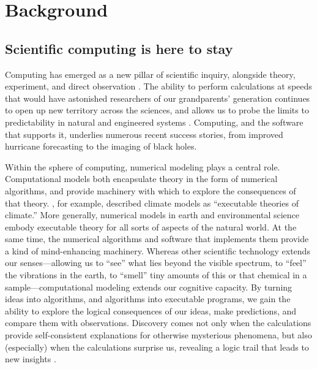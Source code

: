 \documentclass[12pt]{amsart}
\begin{document}
\section{Background}
\label{sec:background}

\subsection{Scientific computing is here to stay}

Computing has emerged as a new pillar of scientific inquiry, alongside theory, experiment, and direct observation  \citep{pitac2005computational}. The ability to perform calculations at speeds that would have astonished researchers of our grandparents' generation continues to open up new territory across the sciences, and allows us to probe the limits to predictability in natural and engineered systems \citep{post2005computational,post2013changing}. Computing, and the software that supports it, underlies numerous recent success stories, from improved hurricane forecasting to the imaging of black holes. 

Within the sphere of computing, numerical modeling plays a central role. Computational models both encapsulate theory in the form of numerical algorithms, and provide machinery with which to explore the consequences of that theory. \citet{pipitone2012assessing}, for example, described climate models as ``executable theories of climate.'' More generally, numerical models in earth and environmental science embody executable theory for all sorts of aspects of the natural world. At the same time, the numerical algorithms and software that implements them provide a kind of mind-enhancing machinery. Whereas other scientific technology extends our senses---allowing us to ``see'' what lies beyond the visible spectrum, to ``feel'' the vibrations in the earth, to ``smell'' tiny amounts of this or that chemical in a sample---computational modeling extends our cognitive capacity. By turning ideas into algorithms, and algorithms into executable programs, we gain the ability to explore the logical consequences of our ideas, make predictions, and compare them with observations. Discovery comes not only when the calculations provide self-consistent explanations for otherwise mysterious phenomena, but also (especially) when the calculations surprise us, revealing a logic trail that leads to new insights \citep{bras2003six}.

\end{document}
